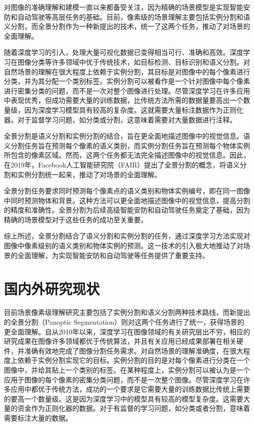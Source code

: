 对图像的准确理解和建模一直以来都备受关注，因为精确的场景模型是实现智能安防和自动驾驶等高层任务的基础。目前，像素级的场景理解主要包括实例分割和语义分割，而全景分割作为一种新提出的技术，统一了这两个任务，推动了对场景的全面理解。

随着深度学习的引入，处理大量可视化数据已变得相当可行、准确和高效。深度学习在图像分类等许多领域中优于传统技术，如目标检测、目标识别和语义分割。对自然场景的理解在很大程度上依赖于实例分割，其目标是对图像中的每个像素进行分类，并为其分配一个类别标签。实例分割可以被看作是一个针对图像中每个像素进行密集分类的问题，而不是一次对整个图像进行处理。尽管深度学习在许多应用中表现优秀，但成功需要大量的训练数据，比传统方法所需的数据量要高出一个数量级，因为深度学习模型具有较高的复杂度。这就需要大量标注数据作为正则化器。对于监督学习问题，如分类或分割，这意味着需要对大量数据进行注释。

全景分割是语义分割和实例分割的结合，旨在更全面地描述图像中的视觉信息。语义分割任务旨在预测每个像素的语义类别，而实例分割任务旨在预测每个物体实例所包含的像素区域。然而，这两个任务都无法完全描述图像中的视觉信息。因此，在2019年，Facebook人工智能研究院（FAIR）提出了全景分割的概念，将语义分割和实例分割统一起来，推动了对场景的全面理解。

全景分割任务要求同时预测每个像素点的语义类别和物体实例编号，即在同一图像中同时预测物体和背景。这种方法可以更全面地描述图像中的视觉信息，提高分割的精度和准确性。全景分割为后续高级智能安防和自动驾驶任务奠定了基础，因为精确的场景模型对于这些任务的成功至关重要。

综上所述，全景分割结合了语义分割和实例分割的任务，通过深度学习方法实现对图像中像素级别的语义类别和物体实例的预测。这一技术的引入极大地推动了对场景的全面理解，为实现智能安防和自动驾驶等任务提供了重要支持。
\section{国内外研究现状}
目前场景像素级理解研究主要包括了实例分割和语义分割两种技术路线，而新提出的全景分割（Panoptic Segmentation）则对这两个任务进行了统一，获得场景的更全面理解。自从2010年以来，深度学习在图像领域的有关研究层出不穷，相应的研究成果在图像许多领域都优于传统算法，并且有关应用已经成果部署在相关硬件，并准确有效地完成了图像分割任务需求。对自然场景的理解准确度，在很大程度上依赖于实例分割实现它的目标。实例分割的目的是对每个像素进行分类在一个图像中，并给其贴上一个类别的标签。在某种程度上，实例分割可以被认为是一个应用于图像的每个像素的密集分类问题，而不是一次整个图像。尽管深度学习在许多应用中都优于传统方法，成功的一个要求是它需要大量的训练数据比传统上需要的要高一个数量级。这是因为深度学习中的模型具有较高的模型复杂度。这需要大量的资金作为正则化器的数据。对于有监督的学习问题，如分类或者分割，意味着需要标注大量的数据。


